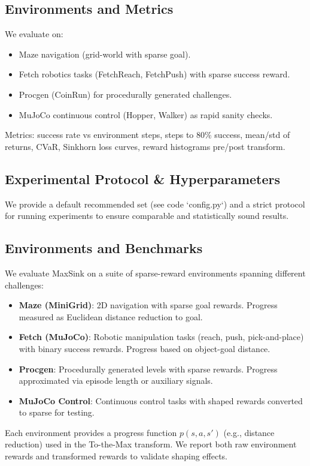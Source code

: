 \documentclass[10pt,twocolumn]{article}
\begin{document}
\subsection{Environments and Metrics}
We evaluate on:
\begin{itemize}
  \item Maze navigation (grid-world with sparse goal).
  \item Fetch robotics tasks (FetchReach, FetchPush) with sparse success reward.
  \item Procgen (CoinRun) for procedurally generated challenges.
  \item MuJoCo continuous control (Hopper, Walker) as rapid sanity checks.
\end{itemize}
Metrics: success rate vs environment steps, steps to 80\% success, mean/std of returns, CVaR, Sinkhorn loss curves, reward histograms pre/post transform.

\subsection{Experimental Protocol \& Hyperparameters}
We provide a default recommended set (see code `config.py`) and a strict protocol for running experiments to ensure comparable and statistically sound results.

\subsection{Environments and Benchmarks}
We evaluate MaxSink on a suite of sparse-reward environments spanning different challenges:
\begin{itemize}
  \item \textbf{Maze (MiniGrid)}: 2D navigation with sparse goal rewards. Progress measured as Euclidean distance reduction to goal.
  \item \textbf{Fetch (MuJoCo)}: Robotic manipulation tasks (reach, push, pick-and-place) with binary success rewards. Progress based on object-goal distance.
  \item \textbf{Procgen}: Procedurally generated levels with sparse rewards. Progress approximated via episode length or auxiliary signals.
  \item \textbf{MuJoCo Control}: Continuous control tasks with shaped rewards converted to sparse for testing.
\end{itemize}
Each environment provides a progress function $p(s,a,s')$ (e.g., distance reduction) used in the To-the-Max transform. We report both raw environment rewards and transformed rewards to validate shaping effects.
\end{document}
